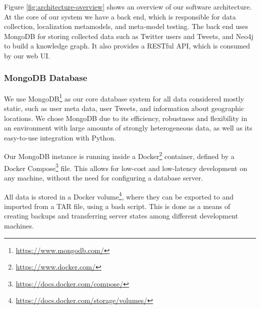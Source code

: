 \documentclass[10pt,a4paper]{article}
\begin{document}
Figure \ref{fig:architecture-overview} shows an overview of our software architecture. At the core of our system we have a back end, which is responsible for data collection, localization metamodels, and meta-model testing. The back end uses MongoDB for storing collected data such as Twitter users and Tweets, and Neo4j to build a knowledge graph. It also provides a RESTful API, which is consumed by our web UI.

\subsubsection{MongoDB Database}
We use MongoDB\footnote{\href{https://www.mongodb.com/}{https://www.mongodb.com/}} as our core database system for all data considered mostly static, such as user meta data, user Tweets, and information about geographic locations. We chose MongoDB due to its efficiency, robustness and flexibility in an environment with large amounts of strongly heterogeneous data, as well as its easy-to-use integration with Python. 

Our MongoDB instance is running inside a Docker\footnote{\href{https://www.docker.com/}{https://www.docker.com/}} container, defined by a Docker Compose\footnote{\href{https://docs.docker.com/compose/}{https://docs.docker.com/compose/}} file. This allows for low-cost and low-latency development on any machine, without the need for configuring a database server.

All data is stored in a Docker volume\footnote{\href{https://docs.docker.com/storage/volumes/}{https://docs.docker.com/storage/volumes/}}, where they can be exported to and imported from a TAR file, using a bash script. This is done as a means of creating backups and transferring server states among different development machines.
\end{document}
